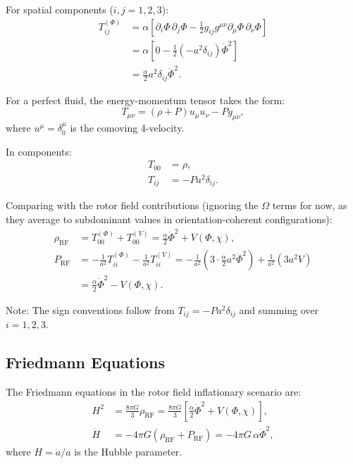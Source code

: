 \documentclass[11pt,a4paper]{article}
\numberwithin{equation}{section}
\theoremstyle{plain}
\theoremstyle{definition}
\theoremstyle{remark}
\begin{document}
For spatial components ($i,j = 1,2,3$):
\begin{align}
T_{ij}^{(\Phi)} &= \alpha\left[\partial_i\Phi\,\partial_j\Phi - \frac{1}{2}g_{ij}g^{\mu\nu}\partial_\mu\Phi\,\partial_\nu\Phi\right]\\
&= \alpha\left[0 - \frac{1}{2}(-a^2\delta_{ij})\dot{\Phi}^2\right]\\
&= \frac{\alpha}{2}a^2\delta_{ij}\dot{\Phi}^2.
\end{align}

For a perfect fluid, the energy-momentum tensor takes the form:
\begin{equation}
T_{\mu\nu} = (\rho + P)u_\mu u_\nu - Pg_{\mu\nu},
\end{equation}
where $u^\mu = \delta^\mu_0$ is the comoving 4-velocity.

In components:
\begin{align}
T_{00} &= \rho,\\
T_{ij} &= -Pa^2\delta_{ij}.
\end{align}

Comparing with the rotor field contributions (ignoring the $\Omega$ terms for now, as they average to subdominant values in orientation-coherent configurations):
\begin{align}
\rho_{\mathrm{RF}} &= T_{00}^{(\Phi)} + T_{00}^{(V)} = \frac{\alpha}{2}\dot{\Phi}^2 + V(\Phi,\chi),\label{eq:rho-rf-derived}\\
P_{\mathrm{RF}} &= -\frac{1}{a^2}T_{ii}^{(\Phi)} - \frac{1}{a^2}T_{ii}^{(V)} = -\frac{1}{a^2}\left(3 \cdot \frac{\alpha}{2}a^2\dot{\Phi}^2\right) + \frac{1}{a^2}\left(3a^2 V\right)\\
&= \frac{\alpha}{2}\dot{\Phi}^2 - V(\Phi,\chi).
\label{eq:P-rf-derived}
\end{align}

Note: The sign conventions follow from $T_{ij} = -Pa^2\delta_{ij}$ and summing over $i=1,2,3$.

\subsection{Friedmann Equations}

The Friedmann equations in the rotor field inflationary scenario are:
\begin{align}
H^2 &= \frac{8\pi G}{3}\rho_{\mathrm{RF}} = \frac{8\pi G}{3}\left[\frac{\alpha}{2}\dot{\Phi}^2 + V(\Phi,\chi)\right],\label{eq:friedmann1}\\
\dot{H} &= -4\pi G(\rho_{\mathrm{RF}} + P_{\mathrm{RF}}) = -4\pi G\,\alpha\dot{\Phi}^2,\label{eq:friedmann2}
\end{align}
where $H = \dot{a}/a$ is the Hubble parameter.
\end{document}

